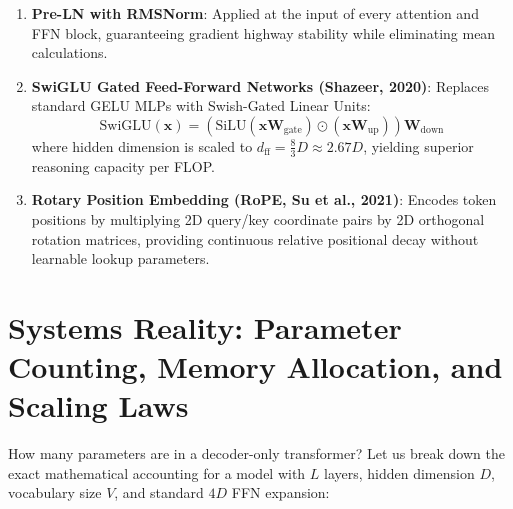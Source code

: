 \documentclass[
  letterpaper,
]{scrbook}
\providecommand{\tightlist}{%
  \setlength{\itemsep}{0pt}\setlength{\parskip}{0pt}}
\begin{document}


\begin{enumerate}
\def\labelenumi{\arabic{enumi}.}
\tightlist
\item
  \textbf{Pre-LN with RMSNorm}: Applied at the input of every attention
  and FFN block, guaranteeing gradient highway stability while
  eliminating mean calculations.
\item
  \textbf{SwiGLU Gated Feed-Forward Networks (Shazeer, 2020)}: Replaces
  standard GELU MLPs with Swish-Gated Linear Units:
  \[\text{SwiGLU}(\mathbf{x}) = \left(\text{SiLU}(\mathbf{x}\mathbf{W}_{\text{gate}}) \odot (\mathbf{x}\mathbf{W}_{\text{up}})\right)\mathbf{W}_{\text{down}}\]
  where hidden dimension is scaled to
  \(d_{\text{ff}} = \frac{8}{3}D \approx 2.67D\), yielding superior
  reasoning capacity per FLOP.
\item
  \textbf{Rotary Position Embedding (RoPE, Su et al., 2021)}: Encodes
  token positions by multiplying 2D query/key coordinate pairs by 2D
  orthogonal rotation matrices, providing continuous relative positional
  decay without learnable lookup parameters.
\end{enumerate}

\section{Systems Reality: Parameter Counting, Memory Allocation, and
Scaling
Laws}\label{systems-reality-parameter-counting-memory-allocation-and-scaling-laws}

How many parameters are in a decoder-only transformer? Let us break down
the exact mathematical accounting for a model with \(L\) layers, hidden
dimension \(D\), vocabulary size \(V\), and standard \(4D\) FFN
expansion:
\end{document}
